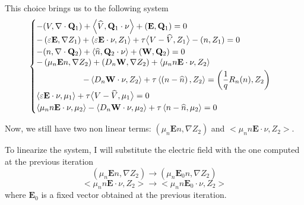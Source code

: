 \documentclass[a4paper,12pt]{article}
\newcommand{\diver}[1]{\ensuremath{\nabla \cdot #1}}
\begin{document}
This choice brings us to the following system
\begin{equation} \label{eq:formulation1nonlinear}
 \begin{cases}
  -(V, \diver{\mathbf{Q}_{1}}) + \left<\widehat{V}, \mathbf{Q}_{1} \cdot \nu \right> + 
      \left(\mathbf{E}, \mathbf{Q}_{1} \right) = 0 \\
  - \left(\varepsilon \mathbf{E}, \nabla Z_{1}\right) + \left<\varepsilon \mathbf{E} \cdot \nu, 
       Z_{1}\right> + \tau \big< V - \widehat{V}, Z_{1} \big> - (n, Z_{1}) = 0 \\
  -(n, \diver{\mathbf{Q}_{2}}) + \left<\widehat{n}, \mathbf{Q}_{2} \cdot \nu \right> + 
      \left(\mathbf{W}, \mathbf{Q}_{2} \right) = 0 \\
  \begin{aligned}
  - \left(\mu_n \mathbf{E} n, \nabla Z_{2} \right) + \left( D_n \mathbf{W}, \nabla Z_{2} \right) + 
      \left<\mu_n n \mathbf{E} \cdot \nu, Z_{2} \right> \hphantom{- \left< D_n \mathbf{W} \cdot \nu, 
      Z_{2} \right> } \\
      - \left< D_n \mathbf{W} \cdot \nu, Z_{2} \right> + \tau \left< \left(n - 
         \widehat{n}\right), Z_{2} \right>  = 
      \left(\frac{1}{q}R_n(n), Z_2\right)
  \end{aligned} \\
   \left<\varepsilon \mathbf{E} \cdot \nu, \mu_{1}\right> + \tau \big< V - \widehat{V}, \mu_{1} 
       \big> = 0 \\
  \left<\mu_n n \mathbf{E} \cdot \nu, \mu_{2} \right> - \left<D_n \mathbf{W} \cdot \nu, \mu_{2} 
       \right> + \tau \left< n - \widehat{n}, \mu_{2} \right> = 0
 \end{cases}
\end{equation}

Now, we still have two non linear terms: $(\mu_n \mathbf{E} n, \nabla Z_{2})$ and 
$<\mu_n n \mathbf{E} \cdot \nu, Z_{2}>$.

To linearize the system, I will substitute the electric field with the one computed at the previous 
iteration
\[  \left(\mu_n \mathbf{E} n, \nabla Z_{2} \right) \rightarrow \left(\mu_n \mathbf{E}_{0} n, \nabla 
Z_{2} \right) \]
\[ <\mu_n n \mathbf{E} \cdot \nu, Z_{2}> \rightarrow <\mu_n n \mathbf{E}_{0} \cdot \nu, Z_{2}>\]
where $\mathbf{E}_0$ is a fixed vector obtained at the previous iteration.
\end{document}
